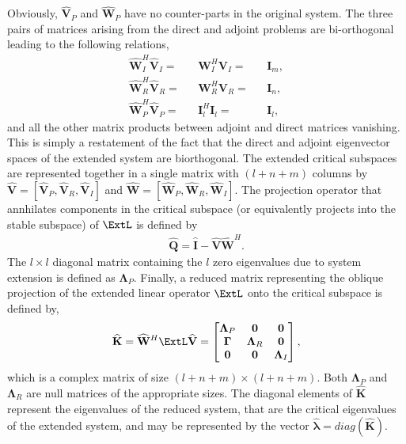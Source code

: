 Obviously, $\mathbf{\widehat{V}}_{P}$ and $\mathbf{\widehat{W}}_{P}$ have no counter-parts in the original system. The three pairs of matrices arising from the direct and adjoint problems are bi-orthogonal leading to the following relations,
\begin{subequations}
	\begin{align}
		\mathbf{\widehat{W}}^{H}_{I}\mathbf{\widehat{V}}_{I} =&& \mathbf{W}^{H}_{I}\mathbf{V}_{I} =&& \mathbf{I}_{m}, \\
		\mathbf{\widehat{W}}^{H}_{R}\mathbf{\widehat{V}}_{R} =&& \mathbf{W}^{H}_{R}\mathbf{V}_{R} =&& \mathbf{I}_{n}, \\
		\mathbf{\widehat{W}}^{H}_{P}\mathbf{\widehat{V}}_{P} =&& \mathbf{I}^{H}_{l}\mathbf{I}_{l} =&& \mathbf{I}_{l}, 
	\end{align}
\end{subequations}
and all the other matrix products between adjoint and direct matrices vanishing. This is simply a restatement of the fact that the direct and adjoint eigenvector spaces of the extended system are biorthogonal. The extended critical subspaces are represented together in a single matrix with $(l+n+m)$ columns by $\mathbf{\widehat{V}} = [\mathbf{\widehat{V}}_{P}, \mathbf{\widehat{V}}_{R}, \mathbf{\widehat{V}}_{I}]$ and $\mathbf{\widehat{W}} = [\mathbf{\widehat{W}}_{P}, \mathbf{\widehat{W}}_{R}, \mathbf{\widehat{W}}_{I}]$. The projection operator that annhilates components in the critical subspace (or equivalently projects into the stable subspace) of $\ExtL$ is defined by
\begin{eqnarray}
	\label{eqn:stable_projector_extended}
	\mathbf{\widehat{Q}} = \mathbf{\widehat{I}} - \mathbf{\widehat{V}}\mathbf{\widehat{W}}^{H}.
\end{eqnarray}
The $l\times l$ diagonal matrix containing the $l$ zero eigenvalues due to system extension is defined as $\mathbf{\Lambda}_{P}$. 
Finally, a reduced matrix representing the oblique projection of the extended linear operator $\ExtL$ onto the critical subspace is defined by,
\begin{eqnarray}
	\label{eqn:khat}
	\mathbf{\widehat{K}} = \mathbf{\widehat{W}}^{H}\ExtL\mathbf{\widehat{V}} = 
	\begin{bmatrix}
		\mathbf{\Lambda}_{P} & \mathbf{0} & \mathbf{0} \\ 
 		\mathbf{\Gamma} &  \mathbf{\Lambda}_{R} & \mathbf{0} \\ 
		\mathbf{0} & \mathbf{0} & \mathbf{\Lambda}_{I} 
	\end{bmatrix},
\end{eqnarray}
which is a complex matrix of size $(l+n+m)\times(l+n+m)$. Both $\mathbf{\Lambda}_{P}$ and $\mathbf{\Lambda}_{R}$ are null matrices of the appropriate sizes. The diagonal elements of $\mathbf{\widehat{K}}$ represent the eigenvalues of the reduced system, that are the critical eigenvalues of the extended system, and may be represented by the vector $\widehat{\boldsymbol{\lambda}} = diag(\mathbf{\widehat{K}})$. 

